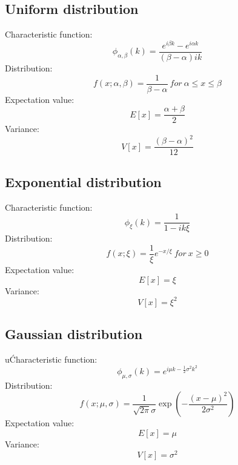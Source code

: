 \documentclass[12pt]{book}
\begin{document}
\subsection{Uniform distribution}
Characteristic function:
\begin{equation}
	\phi_{\alpha,\beta}(k)=\frac{e^{i\beta k}-e^{i\alpha k}}{\left(\beta-\alpha\right)ik}
\end{equation}
Distribution:
\begin{equation}
	f(x;\alpha,\beta) = \frac{1}{\beta-\alpha} \ for \ \alpha \leq x \leq \beta 
\end{equation}
Expectation value:
\begin{equation}
	E[x] = \frac{\alpha + \beta}{2}
\end{equation}
Variance:
\begin{equation}
	V[x] = \frac{(\beta - \alpha)^2}{12}
\end{equation}
\subsection{Exponential distribution}
Characteristic function:
\begin{equation}
	\phi_\xi(k)=\frac{1}{1-ik\xi}
\end{equation}
Distribution:
\begin{equation}
	f(x;\xi) = \frac{1}{\xi}e^{-x/\xi} \ for \ x \geq 0
\end{equation}
Expectation value:
\begin{equation}
	E[x] = \xi
\end{equation}
Variance:
\begin{equation}
	V[x] = \xi^2
\end{equation}
\subsection{Gaussian distribution}u\'
Characteristic function:
\begin{equation}
	\phi_{\mu,\sigma}(k)=e^{i\mu k-\frac{1}{2}\sigma^2k^2}
\end{equation}
Distribution:
\begin{equation}
	f(x;\mu,\sigma) = \frac{1}{\sqrt{2\pi}\sigma}\exp\left(-\frac{(x-\mu)^2}{2\sigma^2}\right)
\end{equation}
Expectation value:
\begin{equation}
	E[x] = \mu
\end{equation}
Variance:
\begin{equation}
	V[x] = \sigma^2
\end{equation}
\end{document}
